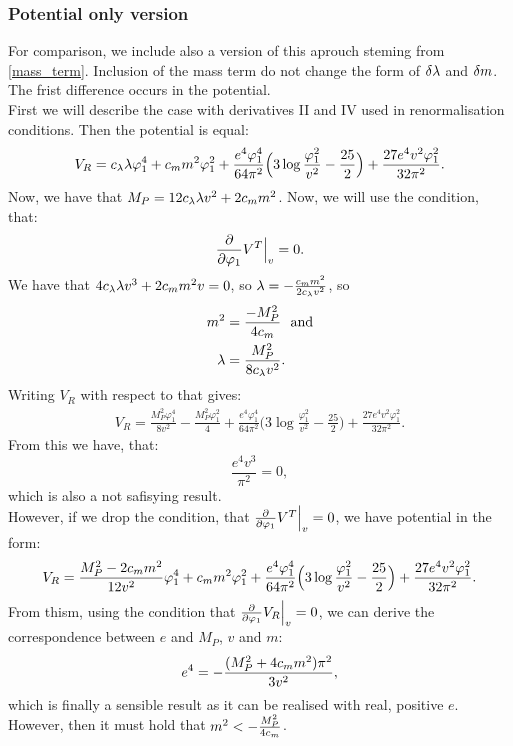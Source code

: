 \subsubsection{Potential only version}
For comparison, we include also a version of this aprouch steming from \ref{mass_term}.
Inclusion of the mass term do not change the
form of $\delta\lambda$ and $\delta m$. The frist difference occurs in the potential. \\
First we will describe the case with derivatives II and IV used in renormalisation conditions. 
Then the potential is equal:
\begin{align}
V_R = c_\lambda\lambda\varphi_1^4 + c_m m^2\varphi_1^2 +
\frac{e^4\varphi_1^4}{64\pi^2}\Big(3\log\frac{\varphi_1^2}{v^2}- 
\frac{25}{2}\Big)+
\frac{27e^4v^2\varphi_1^2}{32\pi^2}.
\end{align}
Now, we have that $M_P = 12c_\lambda\lambda v^2 + 2c_m m^2$. 
Now, we will use the condition, that:
\begin{align}\label{tree_first}
\frac{\partial }{\partial \varphi_1}V^T\Big|_v = 0.
\end{align}
We have that $4c_\lambda\lambda v^3+2c_m m^2v = 0$, so $\lambda = -\frac{c_m m^2}{2c_\lambda v^2}$, so 
\begin{align}
m^2&=\frac{-M_P^2}{4c_m} \textrm{\ \ and}\\ 
\lambda &= \frac{M_P^2}{8c_\lambda v^2}. 
\end{align}
Writing $V_R$ with respect to that gives:
\begin{align}
V_R = \frac{M_P^2\varphi_1^4}{8v^2}-\frac{M_P^2\varphi_1^2}{4} + 
\frac{e^4\varphi_1^4}{64\pi^2}\Big(3\log
\frac{\varphi_1^2}{v^2}- 
\frac{25}{2}\Big)+
\frac{27e^4v^2\varphi_1^2}{32\pi^2}.
\end{align}
From this we have, that:
\begin{equation}
\frac{e^4v^3}{\pi^2} = 0,
\end{equation}
which is also a not safisying result. \\
However, if we drop the condition, that 
$\frac{\partial }{\partial \varphi_1}V^T\Big|_v = 0$, we have potential in the form:
\begin{align}
V_R = \frac{M_P^2-2c_m m^2}{12v^2}\varphi_1^4+c_m m^2\varphi_1^2 + 
\frac{e^4\varphi_1^4}{64\pi^2}\Big(3\log
\frac{\varphi_1^2}{v^2}- 
\frac{25}{2}\Big)+
\frac{27e^4v^2\varphi_1^2}{32\pi^2}.
\end{align}
From thism, using the condition that $\frac{\partial }{\partial \varphi_1}V_R\Big|_v = 0$, we can derive the 
correspondence between $e$ and $M_P$, $v$ and $m$:
\begin{equation}
e^4 = -\frac{(M_P^2+4c_m m^2)\pi^2}{3v^2},
\end{equation}
which is finally a sensible result as it can be realised with real, positive $e$. However, then 
it must hold that $m^2<-\frac{M_P^2}{4c_m}$.
